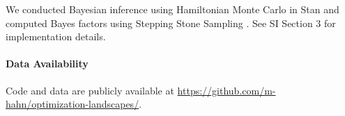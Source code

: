 \documentclass[11pt,a4paper]{article}
\begin{document}
We conducted Bayesian inference using Hamiltonian Monte Carlo in Stan \citep{homan2014the,carpenter2017stan} and computed Bayes factors using Stepping Stone Sampling \citep{xie2011improving}.
See SI Section 3 for implementation details.


\begin{sloppypar}\paragraph{Data Availability} Code and data are publicly available at \url{https://github.com/m-hahn/optimization-landscapes/}.\end{sloppypar}





\end{document}
